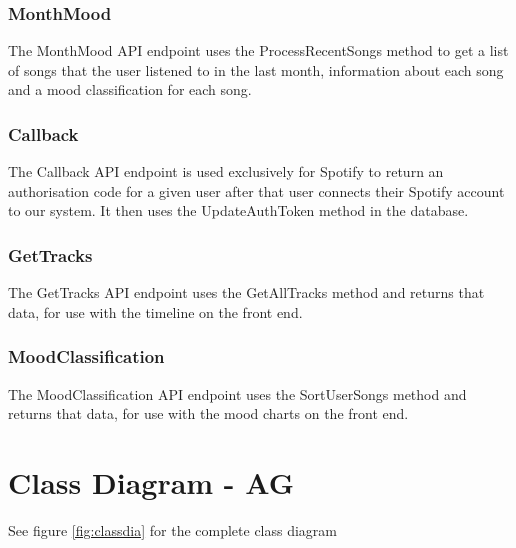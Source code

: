 \documentclass[11pt]{report}
\begin{document}
\subsubsection{MonthMood}
The MonthMood API endpoint uses the ProcessRecentSongs method to get a list of songs that the user listened to in the last month, information about each song and a mood classification for each song.

\subsubsection{Callback}
The Callback API endpoint is used exclusively for Spotify to return an authorisation code for a given user after that user connects their Spotify account to our system. It then uses the UpdateAuthToken method in the database.

\subsubsection{GetTracks}
The GetTracks API endpoint uses the GetAllTracks method and returns that data, for use with the timeline on the front end.

\subsubsection{MoodClassification}
The MoodClassification API endpoint uses the SortUserSongs method and returns that data, for use with the mood charts on the front end.

\section{Class Diagram - AG}

See figure \ref{fig:classdia} for the complete class diagram
\end{document}
